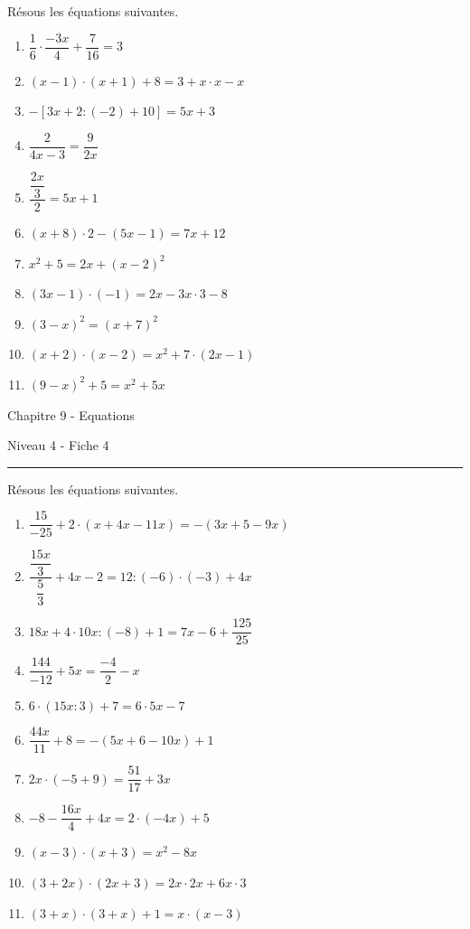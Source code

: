 \documentclass[12pt,parskip=half-, twoside=semi]{scrartcl}
\begin{document}
\begin{exercise}
    Résous les équations suivantes.
      \begin{enumerate}[itemsep=0.4cm]
        \item $\dfrac{1}{6} \cdot \dfrac{-3 x}{4}+\dfrac{7}{16}=3$
        \item $(x-1) \cdot(x+1)+8=3+x \cdot x-x$
        \item $-[3 x+2:(-2)+10]=5 x+3$
        \item $\dfrac{2}{4 x-3}=\dfrac{9}{2 x}$
        \item $\dfrac{\dfrac{2 x}{3}}{2}=5 x+1$
        \item $(x+8) \cdot 2-(5 x-1)=7 x+12$
        \item $x^2+5=2 x+(x-2)^2$
        \item $(3 x-1) \cdot(-1)=2 x-3 x \cdot 3-8$
        \item $(3-x)^2=(x+7)^2$
        \item $(x+2) \cdot(x-2)=x^2+7 \cdot(2 x-1)$
        \item $(9-x)^2+5=x^2+5 x$
    \end{enumerate}
\end{exercise}


\newpage


\begin{center}
  \bfseries
  \begin{Huge}
    Chapitre 9 - Equations
  \end{Huge}
  \smallbreak
  \begin{large}
    Niveau 4  - Fiche 4
  \end{large}
  \smallbreak
  \rule[10pt]{.5\linewidth}{1 pt}
\end{center}
\setcounter{exercise}{0}

\begin{exercise}
    Résous les équations suivantes.
      \begin{enumerate}[itemsep=0.4cm]
        \item $\dfrac{15}{-25}+2 \cdot(x+4 x-11 x)=-(3 x+5-9 x)$
        \item $\dfrac{\dfrac{15 x}{3}}{\dfrac{5}{3}}+4 x-2=12:(-6) \cdot(-3)+4 x$
        \item $18 x+4 \cdot 10 x:(-8)+1=7 x-6+\dfrac{125}{25}$
        \item $\dfrac{144}{-12}+5 x=\dfrac{-4}{2}-x$
        \item $6 \cdot(15 x: 3)+7=6 \cdot 5 x-7$
        \item $\dfrac{44 x}{11}+8=-(5 x+6-10 x)+1$
        \item $2 x \cdot(-5+9)=\dfrac{51}{17}+3 x$
        \item $-8-\dfrac{16 x}{4}+4 x=2 \cdot(-4 x)+5$
        \item $(x-3) \cdot(x+3)=x^2-8 x$
        \item $(3+2 x) \cdot(2 x+3)=2 x \cdot 2 x+6 x \cdot 3$
        \item $(3+x) \cdot(3+x)+1=x \cdot(x-3)$
    \end{enumerate}
\end{exercise}
\end{document}
